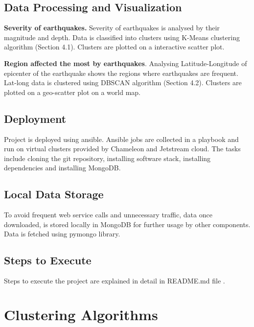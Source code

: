 \documentclass[9pt,twocolumn,twoside]{../../styles/osajnl}
\begin{document}
\subsection{Data Processing and Visualization}

{\bf Severity of earthquakes.} Severity of earthquakes is analysed by their magnitude and depth. Data is classified into clusters using K-Means clustering algorithm (Section 4.1). Clusters are plotted on a interactive scatter plot.

{\bf Region affected the most by earthquakes}. Analysing Latitude-Longitude of epicenter of the earthquake shows the regions where earthquakes are frequent. Lat-long data is clustered using DBSCAN algorithm (Section 4.2). Clusters are plotted on a geo-scatter plot on a world map.

\subsection{Deployment}

Project is deployed using ansible. Ansible jobs are collected in a playbook and run on virtual clusters provided by Chameleon and Jetstream cloud. The tasks include cloning the git repository, installing software stack, installing dependencies and installing MongoDB.

\subsection{Local Data Storage}
To avoid frequent web service calls and unnecessary traffic, data once downloaded, is stored locally in MongoDB for further usage by other components. Data is fetched using pymongo library. 

\subsection{Steps to Execute}

Steps to execute the project are explained in detail in README.md file \cite{readme-001}.

\section{Clustering Algorithms}
\end{document}
